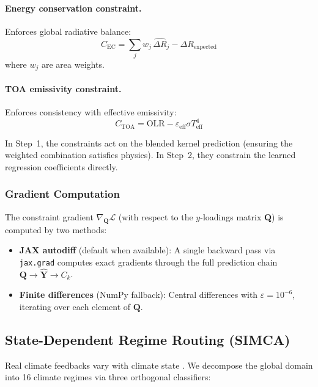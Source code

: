 \documentclass[11pt]{article}
\begin{document}
\paragraph{Energy conservation constraint.} Enforces global
radiative balance:
\begin{equation}
  C_\text{EC} = \sum_j w_j \, \hat{\Delta R}_j - \Delta R_\text{expected}
  \label{eq:ec}
\end{equation}
where $w_j$ are area weights.

\paragraph{TOA emissivity constraint.} Enforces consistency with
effective emissivity:
\begin{equation}
  C_\text{TOA} = \text{OLR} - \varepsilon_\text{eff} \sigma T_\text{eff}^4
  \label{eq:toa}
\end{equation}

In Step~1, the constraints act on the blended kernel prediction
(ensuring the weighted combination satisfies physics). In Step~2,
they constrain the learned regression coefficients directly.

\subsubsection{Gradient Computation}

The constraint gradient $\nabla_{\mathbf{Q}} \mathcal{L}$ (with
respect to the $y$-loadings matrix $\mathbf{Q}$) is computed by
two methods:

\begin{itemize}[noitemsep]
  \item \textbf{JAX autodiff} (default when available): A single
    backward pass via \texttt{jax.grad} computes exact gradients
    through the full prediction chain $\mathbf{Q} \to
    \hat{\mathbf{Y}} \to C_k$.
  \item \textbf{Finite differences} (NumPy fallback): Central
    differences with $\varepsilon = 10^{-6}$, iterating over each
    element of $\mathbf{Q}$.
\end{itemize}

\subsection{State-Dependent Regime Routing (SIMCA)}
\label{sec:simca}

Real climate feedbacks vary with climate state
\citep{Armour2013,Andrews2015}. We decompose the global domain
into 16 climate regimes via three orthogonal classifiers:
\end{document}
